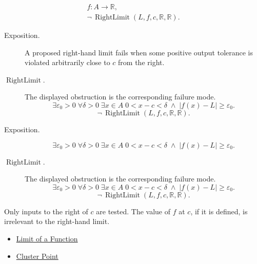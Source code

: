 \begin{remark*}
\[
\begin{aligned}
  f\colon A\to\mathbb{R},\\
  \neg\,\operatorname{RightLimit}(L,f,c,\mathbb{R},\mathbb{R}).
\end{aligned}
\]
\end{remark*}

\begin{remark*}
\begin{description}
  \item[Exposition.]
A proposed right-hand limit fails when some positive output tolerance is
violated arbitrarily close to $c$ from the right.


  \item[\(\operatorname{RightLimit}.\)]
  The displayed obstruction is the corresponding failure mode.
  \[
\exists\varepsilon_0>0\;\forall\delta>0\;\exists x\in A\;
  0<x-c<\delta\;\wedge\; |f(x)-L|\geq\varepsilon_0.
  \]
  \[
\neg\,\operatorname{RightLimit}(L,f,c,\mathbb{R},\mathbb{R}).
  \]
\end{description}
\end{remark*}

\begin{remark*}
\begin{description}
  \item[Exposition.]
\[
  \exists\varepsilon_0>0\;\forall\delta>0\;\exists x\in A\;
  0<x-c<\delta\;\wedge\; |f(x)-L|\geq\varepsilon_0.
\]


  \item[\(\operatorname{RightLimit}.\)]
  The displayed obstruction is the corresponding failure mode.
  \[
\exists\varepsilon_0>0\;\forall\delta>0\;\exists x\in A\;
  0<x-c<\delta\;\wedge\; |f(x)-L|\geq\varepsilon_0.
  \]
  \[
\neg\,\operatorname{RightLimit}(L,f,c,\mathbb{R},\mathbb{R}).
  \]
\end{description}
\end{remark*}

\begin{remark*}[Interpretation]
Only inputs to the right of $c$ are tested. The value of $f$ at $c$, if
it is defined, is irrelevant to the right-hand limit.
\end{remark*}

\begin{dependencies}
\begin{itemize}
  \item \hyperref[def:limit-function]{Limit of a Function}
  \item \hyperref[def:cluster-point-r]{Cluster Point}
\end{itemize}
\end{dependencies}

